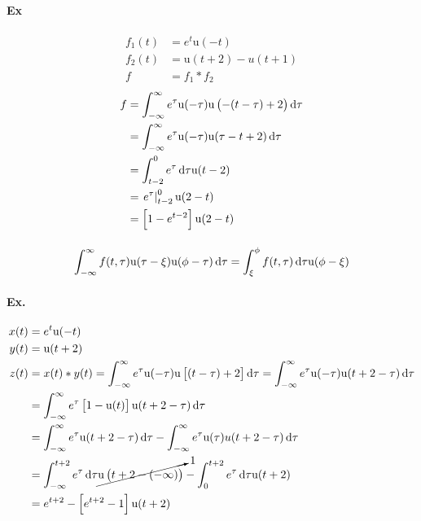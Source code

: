 \documentclass[11pt,a4paper,titlepage,fleqn]{article}
\begin{document}
    \paragraph{Ex}
    \begin{align*}
    f_1(t) &= e^t\mathrm u(-t) \\
    f_2(t) &= \mathrm u(t+2)-u(t+1) \\
    f &= f_1*f_2
    \end{align*}
    \begin{align*}
    f &= \int_{-\infty}^{\infty}  e^\tau \mathrm u(-\tau)
    \mathrm u\left( -(t-\tau)+2 \right)\dif\tau
    \\&= \int_{-\infty}^{\infty} e^\tau \mathrm u(-\tau)
    \mathrm u(\tau-t+2)\dif\tau
    \\&= \int_{t-2}^0 e^\tau\dif\tau\mathrm u(t-2)
    \\&= \left. e^\tau \right|_{t-2}^0\mathrm u(2-t)
    \\&=\left[ 1-e^{t-2} \right]\mathrm u(2-t)
    \end{align*}

	\paragraph{}
	\begin{align*}
	\int_{-\infty}^{\infty} f(t,\tau)\mathrm u(\tau-\xi)\mathrm u(\phi-\tau)\dif\tau
	=\int_\xi^\phi f(t,\tau)\dif \tau \mathrm u(\phi-\xi)
	\end{align*}
	
	\paragraph{Ex.}
	
	
	\begin{align*}
	x(t) &= e^t\mathrm u(-t) \\
	y(t) &= \mathrm u(t+2) \\
	z(t) &= x(t)*y(t) = \int_{-\infty}^{\infty} e^\tau \mathrm u(-\tau)
	\mathrm u \left[(t-\tau)+2\right]\dif\tau
	= \int_{-\infty}^{\infty} e^\tau \mathrm u(-\tau)\mathrm u(t+2-\tau)\dif\tau
	\\ &= \int_{-\infty}^{\infty} e^\tau\left[1-\mathrm u(t)\right]
	\mathrm u(t+2-\tau)\dif \tau \\ &=
	\int_{-\infty}^{\infty} e^\tau \mathrm u(t+2-\tau)\dif\tau-
	\int_{-\infty}^{\infty} e^\tau \mathrm u(\tau)u(t+2-\tau)\dif\tau
	\\ &= \int_{-\infty}^{t+2}e^\tau\dif \tau
	\cancelto{1}{\mathrm u\left(t+2-(-\infty)\right)} - \int_0^{t+2}
	e^\tau\dif\tau \mathrm u(t+2) 
	\\ &= e^{t+2}-\left[ e^{t+2}- 1 \right]\mathrm u(t+2)
	\end{align*}
	
\end{document}
